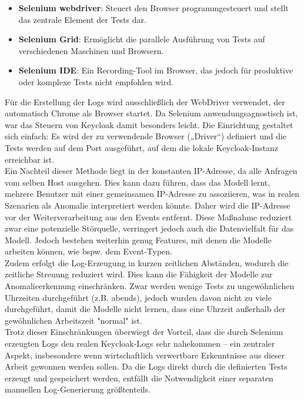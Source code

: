 \documentclass[a4paper,12pt]{article}
\begin{document}
	\begin{itemize}
		\item \textbf{Selenium \gls{webdriver}}: Steuert den Browser programmgesteuert und stellt das zentrale Element der Tests dar.
		\item \textbf{Selenium Grid}: Ermöglicht die parallele Ausführung von Tests auf verschiedenen Maschinen und Browsern.
		\item \textbf{Selenium IDE}: Ein Recording-Tool im Browser, das jedoch für produktive oder komplexe Tests nicht empfohlen wird.
	\end{itemize}
	Für die Erstellung der Logs wird ausschließlich der WebDriver verwendet, der automatisch Chrome als Browser startet. Da Selenium anwendungsagnostisch ist, war das Steuern von Keycloak damit besonders leicht. Die Einrichtung gestaltet sich einfach: Es wird der zu verwendende Browser („Driver“) definiert und die Tests werden auf dem Port ausgeführt, auf dem die lokale Keycloak-Instanz erreichbar ist.
	\\[0.5em]
	Ein Nachteil dieser Methode liegt in der konstanten IP-Adresse, da alle Anfragen vom selben Host ausgehen. Dies kann dazu führen, dass das Modell lernt, mehrere Benutzer mit einer gemeinsamen IP-Adresse zu assoziieren, was in realen Szenarien als Anomalie interpretiert werden könnte. Daher wird die IP-Adresse vor der Weiterverarbeitung aus den Events entfernt. Diese Maßnahme reduziert zwar eine potenzielle Störquelle, verringert jedoch auch die Datenvielfalt für das Modell. Jedoch bestehen weiterhin genug Features, mit denen die Modelle arbeiten können, wie bspw. dem Event-Typen.
	\\[0.5em]
	Zudem erfolgt die Log-Erzeugung in kurzen zeitlichen Abständen, wodurch die zeitliche Streuung reduziert wird. Dies kann die Fähigkeit der Modelle zur Anomalieerkennung einschränken. Zwar werden wenige Tests zu ungewöhnlichen Uhrzeiten durchgeführt (z.B. abends), jedoch wurden davon nicht zu viele durchgeführt, damit die Modelle nicht lernen, dass eine Uhrzeit außerhalb der gewöhnlichen Arbeitszeit "normal" ist.
	\\[0.5em]
	Trotz dieser Einschränkungen überwiegt der Vorteil, dass die durch Selenium erzeugten Logs den realen Keycloak-Logs sehr nahekommen – ein zentraler Aspekt, insbesondere wenn wirtschaftlich verwertbare Erkenntnisse aus dieser Arbeit gewonnen werden sollen. Da die Logs direkt durch die definierten Tests erzeugt und gespeichert werden, entfällt die Notwendigkeit einer separaten manuellen Log-Generierung größtenteils.
\end{document}
